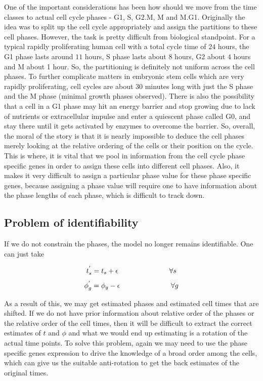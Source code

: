 \documentclass[11pt]{article}
\begin{document}
One of the important considerations has been how should we move from the  time classes to actual  cell cycle phases - G1, S, G2.M, M and M.G1. Originally the idea was to split up the cell cycle appropriately and assign the partitions to these cell phases. However, the task is pretty difficult from biological standpoint. For a typical rapidly proliferating human cell with a total cycle time of $24$ hours, the G1 phase lasts around $11$ hours, S phase lasts about $8$ hours, G2 about $4$ hours and M about 1 hour. So, the partitioning is definitely not uniform across the cell phases. To further complicate matters in embryonic stem cells which are very rapidly proliferating, cell cycles are about 30 minutes long with just the S phase and the M phase (minimal growth phases observed). There is also the possibility that a cell in a G1 phase may hit an energy barrier and stop growing due to lack of nutrients or extracellular impulse and enter a quiescent phase called G0, and stay there until it gets activated by enzymes to overcome the barrier. So, overall, the moral of the story is that it is nearly impossible to deduce the cell phases merely looking at the relative ordering of the cells or their position on the cycle. This is where, it is vital that we pool in information from the cell cycle phase specific genes in order to assign these cells into different cell phases. Also, it makes it very difficult to assign a particular phase value for these phase specific genes, because assigning a phase value will require one to have information about the phase lengths of each phase, which is difficult to track down. 

\subsection{Problem of identifiability}

If we do not constrain the phases, the model no longer remains identifiable. One can just take 

$$ t^{'}_s = t_{s} + \epsilon \hspace{1 in} \forall s $$
$$ \phi^{'}_{g} = \phi_{g} - \epsilon \hspace{1 in} \forall g $$

As a result of this, we may get estimated phases and estimated cell times that are shifted. If we do not have prior information about relative order of the phases or the relative order of the cell times, then it will be difficult to extract the correct estimates of $t$ and $\phi$ and what we would end up estimating is a rotation of the actual time points. To solve this problem, again we may need to use the phase specific genes expression to drive the knowledge of a broad order among the cells, which can give us the suitable anti-rotation to get the back estimates of the original times.
\end{document}
